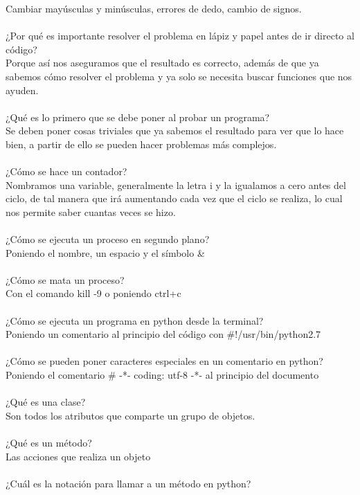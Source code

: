 \documentclass{article}
\begin{document}
Cambiar mayúsculas y minúsculas, errores de dedo, cambio de signos.\\
\\
¿Por qué es importante resolver el problema en lápiz y papel antes de ir directo al código?\\
Porque así nos aseguramos que el resultado es correcto, además de que ya sabemos cómo resolver el problema y ya solo se necesita buscar funciones que nos ayuden.\\
\\
¿Qué es lo primero que se debe poner al probar un programa?\\
Se deben poner cosas triviales que ya sabemos el resultado para ver que lo hace bien, a partir de ello se pueden hacer problemas más complejos.\\
\\
¿Cómo se hace un contador?\\
Nombramos una variable, generalmente la letra i y la igualamos a cero antes del ciclo, de tal manera que irá aumentando cada vez que el ciclo se realiza, lo cual nos permite saber cuantas veces se hizo. \\
\\
¿Cómo se ejecuta un proceso en segundo plano?\\
Poniendo el nombre, un espacio y el símbolo \&\\
\\
¿Cómo se mata un proceso?\\
Con el comando kill -9 o poniendo ctrl+c\\
\\
¿Cómo se ejecuta un programa en python desde la terminal?\\
Poniendo un comentario al principio del código con \#!/usr/bin/python2.7\\
\\
¿Cómo se pueden poner caracteres especiales en un comentario en python?\\
Poniendo el comentario \# -*- coding: utf-8 -*- al principio del documento\\
\\
¿Qué es una clase?\\
Son todos los atributos que comparte un grupo de objetos.\\
\\
¿Qué es un método?\\
Las acciones que realiza un objeto\\
\\
¿Cuál es la notación para llamar a un método en python?\\
\end{document}
